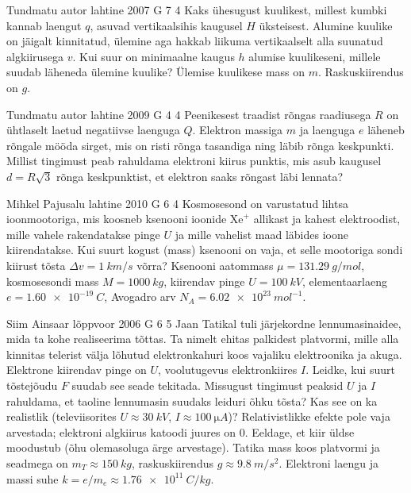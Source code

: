 \documentclass[11pt]{article}
\begin{document}
{%
{Tundmatu autor} %
{lahtine} %
{2007} %
{G 7} %
{4} %
{
\ifStatement
Kaks ühesugust kuulikest, millest kumbki kannab laengut $q$, asuvad vertikaalsihis kaugusel $H$ üksteisest. Alumine kuulike on jäigalt kinnitatud, ülemine aga hakkab liikuma vertikaalselt alla suunatud algkiirusega $v$. Kui suur on minimaalne kaugus $h$ alumise kuulikeseni, millele suudab läheneda ülemine kuulike? Ülemise kuulikese mass on $m$. Raskuskiirendus on $g$.
\fi
}

{Tundmatu autor} %
{lahtine} %
{2009} %
{G 4} %
{4} %
{
\ifStatement
Peenikesest traadist rõngas raadiusega $R$ on ühtlaselt laetud negatiivse laenguga $Q$. Elektron massiga $m$ ja laenguga $e$ läheneb rõngale mööda sirget, mis on risti rõnga tasandiga ning läbib rõnga keskpunkti. Millist tingimust peab rahuldama elektroni kiirus punktis, mis asub kaugusel $d = R\sqrt 3$ rõnga keskpunktist, et elektron saaks rõngast läbi lennata?
\fi
}

{Mihkel Pajusalu} %
{lahtine} %
{2010} %
{G 6} %
{4} %
{
\ifStatement
Kosmosesond on varustatud lihtsa ioonmootoriga, mis koosneb ksenooni
ioonide $\mathrm{Xe}^+$ allikast ja kahest elektroodist, mille vahele rakendatakse pinge
$U$ ja mille vahelist maad läbides ioone kiirendatakse. Kui suurt kogust
(mass) ksenooni on vaja, et selle mootoriga sondi kiirust tõsta
$\Delta v=\SI{1}{km/s}$ võrra?
%
Ksenooni aatommass $\mu=\SI{131,29}{g/mol}$, kosmosesondi mass $M=\SI{1000}{kg}$, kiirendav pinge
$U=\SI{100}{kV}$, elementaarlaeng $e=\SI{1,60 e-19}{C}$, Avogadro arv
$N_A= \SI{6,02 e23}{mol^{-1}}$.
\fi
}

{Siim Ainsaar} %
{lõppvoor} %
{2006} %
{G 6} %
{5} %
{
\ifStatement
Jaan Tatikal tuli järjekordne lennumasinaidee, mida ta kohe realiseerima tõttas. Ta nimelt ehitas palkidest platvormi, mille alla kinnitas telerist välja lõhutud elektronkahuri koos vajaliku elektroonika ja akuga. Elektrone kiirendav pinge on $U$, voolutugevus elektronkiires $I$. Leidke, kui suurt tõstejõudu $F$ suudab see seade tekitada. Missugust tingimust peaksid $U$ ja $I$ rahuldama, et taoline lennumasin suudaks leiduri õhku tõsta? Kas see on ka realistlik (televiisorites $U \approx \SI{30}{kV}$, $I \approx \SI{100}{\micro A}$)? Relativistlikke efekte pole vaja arvestada; elektroni algkiirus katoodi juures on 0. Eeldage, et kiir üldse moodustub (õhu olemasoluga ärge arvestage). Tatika mass koos platvormi ja seadmega on $m_T \approx \SI{150}{kg}$, raskuskiirendus $g \approx \SI{9,8}{m/s^2}$. Elektroni laengu ja massi suhe $k = e/m_e \approx \SI{1,76e11}{C/kg}$.
\fi
}

}
\end{document}
